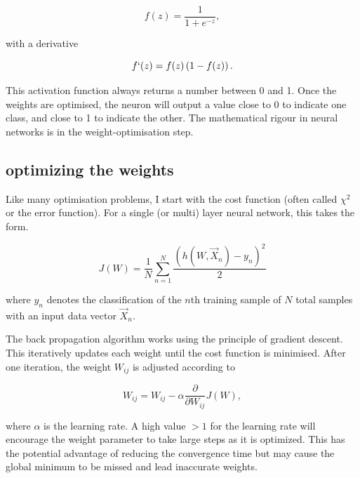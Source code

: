 \documentclass[10pt]{article}
\begin{document}
\begin{equation} 
f(z) = \frac{1}{1+e^{-z}},
\label{eq_sigmoid}
\end{equation}

\noindent with a derivative

\begin{equation} 
f`(z) = f(z) \left( 1 - f(z) \right).
\label{eq_sigmoid}
\end{equation}


\noindent This activation function always returns a number between 0 and 1. Once the weights are optimised, the neuron will output a value close to 0 to indicate one class, and close to 1 to indicate the other. The mathematical rigour in neural networks is in the weight-optimisation step. 







\subsection{optimizing the weights}

Like many optimisation problems, I start with the cost function (often called $\chi^2$ or the error function). For a single (or multi) layer neural network, this takes the form.

\begin{equation}
J(W) = \frac{1}{N} \sum_{n=1}^N \frac{ \left( h(W,\vec{X}_n) - y_n \right)^2} {2}
\label{eq_cost}
\end{equation}

\noindent where $y_n$ denotes the classification of the $n$th training sample of $N$ total samples with an input data vector $\vec{X}_n$.



The back propagation algorithm works using the principle of gradient descent. This iteratively updates each weight until the cost function is minimised. After one iteration, the weight $W_{ij}$ is adjusted according to 

\begin{equation}
W_{ij} = W_{ij} - \alpha \frac{\partial}{\partial W_{ij}} J\left( W \right),
\label{eq_adjust_w}
\end{equation}



\noindent where $\alpha$ is the learning rate. A high value $>1$ for the learning rate will encourage the weight parameter to take large steps as it is optimized. This has the potential advantage of reducing the convergence time but may cause the global minimum to be missed and lead inaccurate weights.
\end{document}
